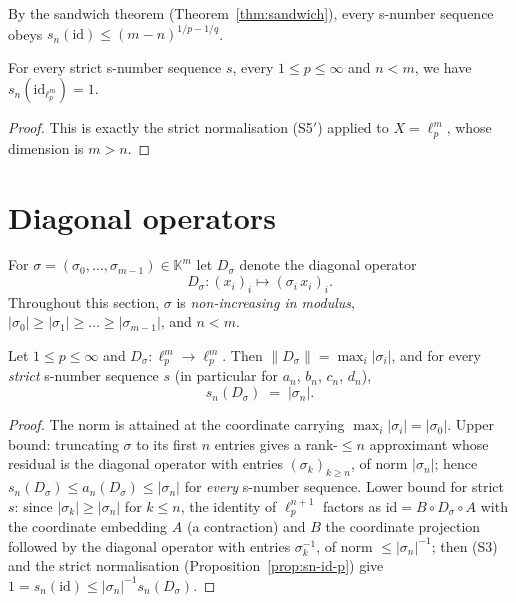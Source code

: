 By the sandwich theorem (Theorem~\ref{thm:sandwich}), every s-number
sequence obeys $s_n(\mathrm{id}) \le (m-n)^{1/p-1/q}$.

\begin{proposition}
\label{prop:sn-id-p}
\leanok
{}
For every strict s-number sequence $s$, every $1 \le p \le \infty$ and
$n < m$, we have $s_n(\mathrm{id}_{\ell_p^m}) = 1$.
\end{proposition}
\begin{proof}
\leanok
This is exactly the strict normalisation (S5$'$) applied to
$X = \ell_p^m$, whose dimension is $m > n$.
\end{proof}

\section{Diagonal operators}
\label{sec:ex-diagonal}

For $\sigma = (\sigma_0, \dots, \sigma_{m-1}) \in \mathbb{K}^m$ let
$D_\sigma$ denote the diagonal operator
\[
  D_\sigma : (x_i)_i \longmapsto (\sigma_i \, x_i)_i .
\]
Throughout this section, $\sigma$ is \emph{non-increasing in modulus},
$|\sigma_0| \ge |\sigma_1| \ge \dots \ge |\sigma_{m-1}|$, and
$n < m$.

\begin{theorem}
\label{thm:diag-same}
\leanok
{}
Let $1 \le p \le \infty$ and $D_\sigma : \ell_p^m \to \ell_p^m$. Then
$\|D_\sigma\| = \max_i |\sigma_i|$, and for every \emph{strict}
s-number sequence $s$ (in particular for $a_n$, $b_n$, $c_n$, $d_n$),
\[
  s_n(D_\sigma) \;=\; |\sigma_n| .
\]
\end{theorem}
\begin{proof}
\leanok
{}
The norm is attained at the coordinate carrying $\max_i |\sigma_i| =
|\sigma_0|$. Upper bound: truncating $\sigma$ to its first $n$ entries
gives a rank-$\le n$ approximant whose residual is the diagonal operator
with entries $(\sigma_k)_{k \ge n}$, of norm $|\sigma_n|$; hence
$s_n(D_\sigma) \le a_n(D_\sigma) \le |\sigma_n|$ for \emph{every}
s-number sequence. Lower bound for strict $s$: since
$|\sigma_k| \ge |\sigma_n|$ for $k \le n$, the identity of
$\ell_p^{n+1}$ factors as $\mathrm{id} = B \circ D_\sigma \circ A$ with the
coordinate embedding $A$ (a contraction) and $B$ the coordinate projection
followed by the diagonal operator with entries $\sigma_k^{-1}$, of norm
$\le |\sigma_n|^{-1}$; then (S3) and the strict normalisation
(Proposition~\ref{prop:sn-id-p}) give
$1 = s_n(\mathrm{id}) \le |\sigma_n|^{-1} s_n(D_\sigma)$.
\end{proof}

